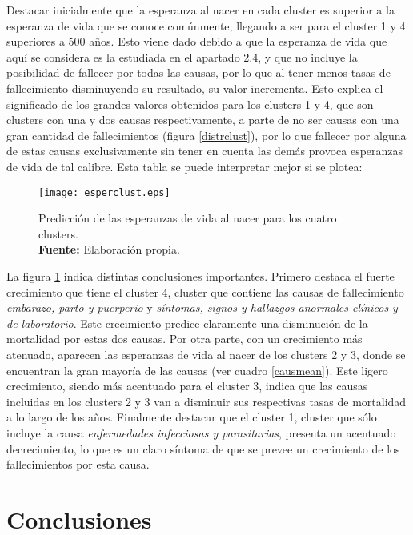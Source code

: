 \documentclass{article}
\begin{document}
Destacar inicialmente que la esperanza al nacer en cada cluster es superior a la esperanza de vida que se conoce comúnmente, llegando a ser para el cluster 1 y 4 superiores a 500 años. Esto viene dado debido a que la esperanza de vida que aquí se considera es la estudiada en el apartado 2.4, y que no incluye la posibilidad de fallecer por todas las causas, por lo que al tener menos tasas de fallecimiento disminuyendo su resultado, su valor incrementa. Esto explica el significado de los grandes valores obtenidos para los clusters 1 y 4, que son clusters con una y dos causas respectivamente, a parte de no ser causas con una gran cantidad de fallecimientos (figura \ref{distrclust}), por lo que fallecer por alguna de estas causas exclusivamente sin tener en cuenta las demás provoca esperanzas de vida de tal calibre.
Esta tabla se puede interpretar mejor si se plotea:

\begin{figure}[H]
\centering
\texttt{[image: esperclust.eps]}
\caption{\centering Predicción de las esperanzas de vida al nacer para los cuatro clusters. \\ \textbf{Fuente:} Elaboración propia.}
\label{esperevo}
\end{figure}

La figura \ref{esperevo} indica distintas conclusiones importantes. Primero destaca el fuerte crecimiento que tiene el cluster 4, cluster que contiene las causas de fallecimiento \emph{embarazo, parto y puerperio} y \emph{síntomas, signos y hallazgos anormales clínicos y de laboratorio}. Este crecimiento predice claramente una disminución de la mortalidad por estas dos causas. Por otra parte, con un crecimiento más atenuado, aparecen las esperanzas de vida al nacer de los clusters 2 y 3, donde se encuentran la gran mayoría de las causas (ver cuadro \ref{causmean}). Este ligero crecimiento, siendo más acentuado para el cluster 3, indica que las causas incluidas en los clusters 2 y 3 van a disminuir sus respectivas tasas de mortalidad a lo largo de los años. Finalmente destacar que el cluster 1, cluster que sólo incluye la causa \emph{enfermedades infecciosas y parasitarias}, presenta un acentuado decrecimiento, lo que es un claro síntoma de que se prevee un crecimiento de los fallecimientos por esta causa.

\vspace{0.3cm}

\newpage
\section{Conclusiones}
\end{document}

